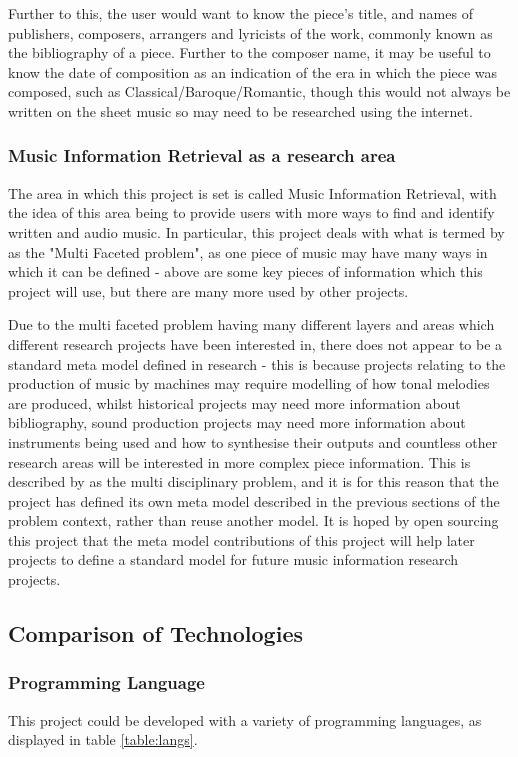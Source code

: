 Further to this, the user would want to know the piece's title, and names of publishers, composers, arrangers and lyricists of the work, commonly known as the bibliography of a piece\parencite{MIR}. Further to the composer name, it may be useful to know the date of composition as an indication of the era in which the piece was composed, such as Classical/Baroque/Romantic, though this would not always be written on the sheet music so may need to be researched using the internet.

\subsubsection{Music Information Retrieval as a research area}
The area in which this project is set is called Music Information Retrieval, with the idea of this area being to provide users with more ways to find and identify written and audio music\parencite{MIR}. In particular, this project deals with what is termed by \cite{MIR} as the "Multi Faceted problem", as one piece of music may have many ways in which it can be defined - above are some key pieces of information which this project will use, but there are many more used by other projects.

Due to the multi faceted problem having many different layers and areas which different research projects have been interested in, there does not appear to be a standard meta model defined in research - this is because projects relating to the production of music by machines may require modelling of how tonal melodies are produced\parencite{creativeMachines}, whilst historical projects may need more information about bibliography, sound production projects may need more information about instruments being used and how to synthesise their outputs and countless other research areas will be interested in more complex piece information. This is described by \cite{MIR} as the multi disciplinary problem, and it is for this reason that the project has defined its own meta model described in the previous sections of the problem context, rather than reuse another model. It is hoped by open sourcing this project that the meta model contributions of this project will help later projects to define a standard model for future music information research projects.

\subsection{Comparison of Technologies}
\subsubsection{Programming Language}
This project could be developed with a variety of programming languages, as displayed in table \ref{table:langs}.

